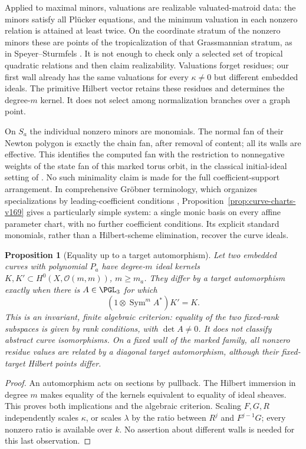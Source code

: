 \documentclass[11pt,reqno]{amsart}
\numberwithin{equation}{section}
\newtheorem{proposition}[theorem]{Proposition}
\theoremstyle{definition}\newtheorem{definition}[theorem]{Definition}
\theoremstyle{remark}\newtheorem{remark}[theorem]{Remark}
\newcommand{\OO}{\mathcal O}\newcommand{\II}{\mathcal I}
\begin{document}
Applied to maximal minors, valuations are realizable valuated-matroid
data: the minors satisfy all Pl\"ucker equations, and the minimum
valuation in each nonzero relation is attained at least twice. On the coordinate stratum of the nonzero minors these are points
of the tropicalization of that Grassmannian stratum, as in
Speyer--Sturmfels \cite[Theorem~2.1 and Section~3]{SpeyerSturmfels169}.
It is not enough to check only a selected set of tropical quadratic
relations and then claim realizability. Valuations forget residues;
our first wall already has the same valuations for every $\kappa\ne0$
but different embedded ideals. The primitive Hilbert vector retains
these residues and determines the degree-$m$ kernel. It does not
select among normalization branches over a graph point.

On $S_a$ the individual nonzero minors are monomials. The normal fan
of their Newton polygon is exactly the chain fan, after removal of
content; all its walls are effective. This identifies the computed fan
with the restriction to nonnegative weights of the state fan of this marked torus orbit, in the classical
initial-ideal setting of \cite{BayerMorrison167}. No such minimality
claim is made for the full coefficient-support arrangement. In
comprehensive Gr\"obner terminology, which organizes specializations
by leading-coefficient conditions \cite{ManubensMontes169},
Proposition~\ref{prop:curve-charts-v169} gives a particularly simple
system: a single monic basis on every affine parameter chart, with no
further coefficient conditions. Its explicit standard monomials,
rather than a Hilbert-scheme elimination, recover the curve ideals.

\begin{proposition}[Equality up to a target automorphism]
\label{prop:target-equivalence-v169}
Let two embedded curves with polynomial $P_a$ have degree-$m$
ideal kernels $K,K'\subset H^0(X,\OO(m,m))$, $m\geq m_a$.
They differ by a target automorphism exactly when there is
$A\in\PGL_3$ for which
\[
 (1\otimes\operatorname{Sym}^m A^*)K'=K.
\]
This is an invariant, finite algebraic criterion: equality of the
two fixed-rank subspaces is given by rank conditions, with $\det A\ne0$.
It does not classify abstract curve isomorphisms. On a fixed wall
of the marked family, all nonzero residue values are related by a
diagonal target automorphism, although their fixed-target Hilbert
points differ.
\end{proposition}
\begin{proof}
An automorphism acts on sections by pullback. The Hilbert immersion
in degree $m$ makes equality of the kernels equivalent to equality
of ideal sheaves. This proves both implications and the algebraic
criterion. Scaling $F,G,R$ independently scales $\kappa$, or scales
$\lambda$ by the ratio between $R^j$ and $F^{j-1}G$; every nonzero
ratio is available over $k$. No assertion about different walls is
needed for this last observation.
\end{proof}
\end{document}
